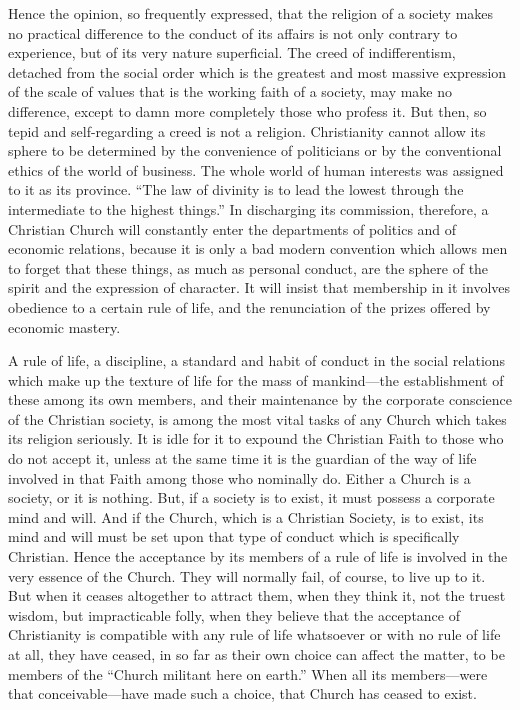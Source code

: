 \documentclass{book}
\begin{document}
Hence the opinion, so frequently expressed, that the religion of a society makes no practical difference to the conduct of its affairs is not only contrary to experience, but of its very nature superficial. The creed of indifferentism, detached from the social order which is the greatest and most massive expression of the scale of values that is the working faith of a society, may make no difference, except to damn more completely those who profess it. But then, so tepid and self-regarding a creed is not a religion. Christianity cannot allow its sphere to be determined by the convenience of politicians or by the conventional ethics of the world of business. The whole world of human interests was assigned to it as its province. “The law of divinity is to lead the lowest through the intermediate to the highest things.” In discharging its commission, therefore, a Christian Church will constantly enter the departments of politics and of economic relations, because it is only a bad modern convention which allows men to forget that these things, as much as personal conduct, are the sphere of the spirit and the expression of character. It will insist that membership in it involves obedience to a certain rule of life, and the renunciation of the prizes offered by economic mastery.

A rule of life, a discipline, a standard and habit of conduct in the social relations which make up the texture of life for the mass of mankind—the establishment of these among its own members, and their maintenance by the corporate conscience of the Christian society, is among the most vital tasks of any Church which takes its religion seriously. It is idle for it to expound the Christian Faith to those who do not accept it, unless at the same time it is the guardian of the way of life involved in that Faith among those who nominally do. Either a Church is a society, or it is nothing. But, if a society is to exist, it must possess a corporate mind and will. And if the Church, which is a Christian Society, is to exist, its mind and will must be set upon that type of conduct which is specifically Christian. Hence the acceptance by its members of a rule of life is involved in the very essence of the Church. They will normally fail, of course, to live up to it. But when it ceases altogether to attract them, when they think it, not the truest wisdom, but impracticable folly, when they believe that the acceptance of Christianity is compatible with any rule of life whatsoever or with no rule of life at all, they have ceased, in so far as their own choice can affect the matter, to be members of the “Church militant here on earth.” When all its members—were that conceivable—have made such a choice, that Church has ceased to exist.
\end{document}
